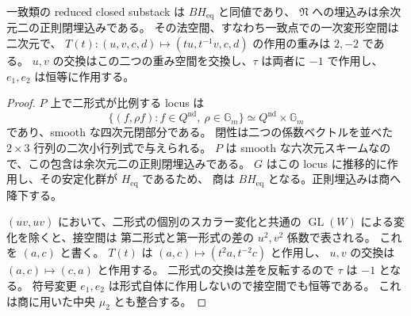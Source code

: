 \begin{proposition}
\label{prop:noncubic-coincident-gerbe-tangent}
一致類の reduced closed substack は $BH_{\mathrm{eq}}$ と同値であり、
$\mathfrak N$ への埋込みは余次元二の正則閉埋込みである。
その法空間、すなわち一致点での一次変形空間は二次元で、
$T(t):(u,v,c,d)\mapsto(tu,t^{-1}v,c,d)$ の作用の重みは $2,-2$ である。
$u,v$ の交換はこの二つの重み空間を交換し、$\tau$ は両者に $-1$ で作用し、
$e_1,e_2$ は恒等に作用する。
\end{proposition}

\begin{proof}
$P$ 上で二形式が比例する locus は
\[
 \{(f,\rho f): f\in Q^{\mathrm{nd}},\ \rho\in\mathbb G_m\}
 \simeq Q^{\mathrm{nd}}\times\mathbb G_m
\]
であり、smooth な四次元閉部分である。
閉性は二つの係数ベクトルを並べた $2\times3$ 行列の二次小行列式で与えられる。
$P$ は smooth な六次元スキームなので、この包含は余次元二の正則閉埋込みである。
$G$ はこの locus に推移的に作用し、その安定化群が $H_{\mathrm{eq}}$ であるため、
商は $BH_{\mathrm{eq}}$ となる。正則埋込みは商へ降下する。

$(uv,uv)$ において、二形式の個別のスカラー変化と共通の
$\operatorname{GL}(W)$ による変化を除くと、接空間は
第二形式と第一形式の差の $u^2,v^2$ 係数で表される。
これを $(a,c)$ と書く。
$T(t)$ は $(a,c)\mapsto(t^2a,t^{-2}c)$ と作用し、
$u,v$ の交換は $(a,c)\mapsto(c,a)$ と作用する。
二形式の交換は差を反転するので $\tau$ は $-1$ となる。
符号変更 $e_1,e_2$ は形式自体に作用しないので接空間でも恒等である。
これは商に用いた中央 $\mu_2$ とも整合する。
\end{proof}


